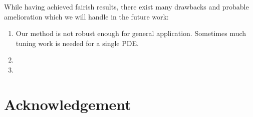 \documentclass{article}
\begin{document}
While having achieved fairish results, there exist many drawbacks and probable amelioration which we will handle in the future work:

\begin{enumerate}
\item
Our method is not robust enough for general application. Sometimes much tuning work is needed for a single PDE.
\item

\item

\end{enumerate}

\section*{Acknowledgement}



\cite{Evans2010Partial}
\cite{Weinan2018The}
\cite{He2016Deep}

\medskip

\small
\end{document}
